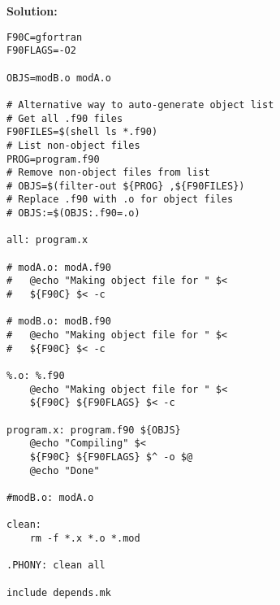 \documentclass{article}
\begin{document}
{\bf Solution:}

\begin{lstlisting}
F90C=gfortran
F90FLAGS=-O2

OBJS=modB.o modA.o

# Alternative way to auto-generate object list
# Get all .f90 files
F90FILES=$(shell ls *.f90)
# List non-object files
PROG=program.f90
# Remove non-object files from list
# OBJS=$(filter-out ${PROG} ,${F90FILES})
# Replace .f90 with .o for object files
# OBJS:=$(OBJS:.f90=.o)

all: program.x

# modA.o: modA.f90
# 	@echo "Making object file for " $<
# 	${F90C} $< -c

# modB.o: modB.f90
# 	@echo "Making object file for " $<
# 	${F90C} $< -c

%.o: %.f90
	@echo "Making object file for " $<
	${F90C} ${F90FLAGS} $< -c

program.x: program.f90 ${OBJS}
	@echo "Compiling" $<
	${F90C} ${F90FLAGS} $^ -o $@
	@echo "Done"

#modB.o: modA.o

clean:
	rm -f *.x *.o *.mod

.PHONY: clean all

include depends.mk

\end{lstlisting}
\pagebreak
\end{document}
